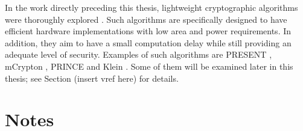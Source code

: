 In the work directly preceding this thesis, lightweight cryptographic algorithms were thoroughly explored \cite{harttung17lightweightcrypto}. Such
algorithms are
specifically designed to have efficient hardware implementations with low area and power requirements. In addition, they aim to have a small
computation delay while still providing an adequate level of security. Examples of such algorithms are PRESENT \cite{bogdanov07present},
mCrypton \cite{lim06mcrypton}, PRINCE \cite{borghoff12prince} and Klein \cite{gong12klein}. Some of them will be examined later in this
thesis; see Section (insert vref here) for details. %

\iffalse
\section{Notes}
